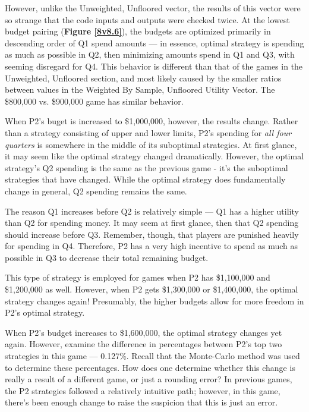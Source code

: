 \documentclass[11pt]{article}
\begin{document}
However, unlike the Unweighted, Unfloored vector, the results of this vector were so strange that the code inputs and outputs were checked twice. At the lowest budget pairing (\textbf{Figure \ref{8v8.6}}), the budgets are optimized primarily in descending order of Q1 spend amounts --- in essence, optimal strategy is spending as much as possible in Q2, then minimizing amounts spend in Q1 and Q3, with seeming disregard for Q4. This behavior is different than that of the games in the Unweighted, Unfloored section, and most likely caused by the smaller ratios between values in the Weighted By Sample, Unfloored Utility Vector. The \$800,000 vs. \$900,000 game has similar behavior. 

When P2's buget is increased to \$1,000,000, however, the results change. Rather than a strategy consisting of upper and lower limits, P2's spending for \textit{all four quarters} is somewhere in the middle of its suboptimal strategies. At first glance, it may seem like the optimal strategy changed dramatically. However, the optimal strategy's Q2 spending is the same as the previous game - it's the suboptimal strategies that have changed. While the optimal strategy does fundamentally change in general, Q2 spending remains the same. 

The reason Q1 increases before Q2 is relatively simple --- Q1 has a higher utility than Q2 for spending money. It may seem at first glance, then that Q2 spending should increase before Q3. Remember, though, that players are punished heavily for spending in Q4. Therefore, P2 has a very high incentive to spend as much as possible in Q3 to decrease their total remaining budget. 

This type of strategy is employed for games when P2 has \$1,100,000 and \$1,200,000 as well. However, when P2 gets \$1,300,000 or \$1,400,000, the optimal strategy changes again! Presumably, the higher budgets allow for more freedom in P2's optimal strategy. 

When P2's budget increases to \$1,600,000, the optimal strategy changes yet again. However, examine the difference in percentages between P2's top two strategies in this game --- 0.127\%. Recall that the Monte-Carlo method was used to determine these percentages. How does one determine whether this change is really a result of a different game, or just a rounding error? In previous games, the P2 strategies followed a relatively intuitive path; however, in this game, there's been enough change to raise the suspicion that this is just an error. 
\end{document}
